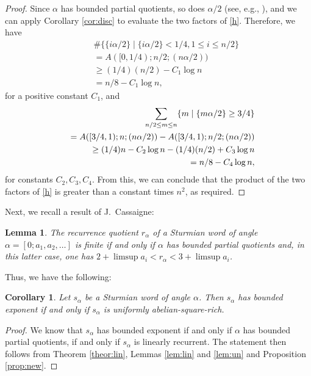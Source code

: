 \documentclass[11pt,reqno]{amsart}
\numberwithin{equation}{section}
\theoremstyle{plain}
\newtheorem{corollary}[theorem]{Corollary}
\newtheorem{lemma}[theorem]{Lemma}
\theoremstyle{definition}
\theoremstyle{remark}
\begin{document}
\begin{proof}
Since $\alpha$ has bounded partial quotients, so does $\alpha/2$ (see, e.g., \cite{LS97}), and we can apply Corollary \ref{cor:disc} to evaluate the two factors of \eqref{h}. Therefore, we have
\begin{eqnarray*}
&& \# \{ \{i \alpha/2\}\mid\{i \alpha/2\}<1/4, 1\leq i\leq n/2\} \\ 
%
&& = A([0,1/4);n/2;(n\alpha/2)) \\\
%
&& \geq (1/4)(n/2)-C_1\log n \\
&& = n/8-C_1\log n,
\end{eqnarray*}
for a positive constant $C_1$, and
\begin{eqnarray*}
&& \hspace{-3mm} \sum_{n/2\leq m\leq n} \{ m \mid \{m \alpha/2\}\geq 3/4 \} \\
%
&& =A([3/4,1);n;(n\alpha/2))-A([3/4,1);n/2;(n\alpha/2)) \\
&&  \geq (1/4)n-C_2\log n - (1/4)(n/2) +C_3\log n \\
%
&& = n/8 - C_4 \log n,
\end{eqnarray*}
for  constants $C_2,C_3,C_4$. From this, we can conclude that the product of the two factors of \eqref{h} is greater than a constant times $n^2$, as required.
\end{proof}

Next, we recall a result of J.~Cassaigne:

\begin{lemma}\cite[Prop.~5]{Ca99}
 The recurrence quotient $r_{\alpha}$ of a Sturmian word of angle $\alpha=[0;a_1,a_2,\ldots]$ is finite if and only if $\alpha$ has bounded partial quotients and, in this latter case, one has $2+\limsup a_i < r_{\alpha} <3+\limsup a_i$.
\end{lemma}

Thus, we have the following:

\begin{corollary}
 Let $s_{\alpha}$ be a Sturmian word of angle $\alpha$. Then  $s_{\alpha}$ has bounded exponent if and only if $s_{\alpha}$ is uniformly abelian-square-rich.
\end{corollary}

\begin{proof}
We know that $s_{\alpha}$  has bounded exponent if and only if $\alpha$ has bounded partial quotients, if and only if $s_{\alpha}$ is linearly recurrent. The statement then follows from Theorem \ref{theor:lin}, Lemmas \ref{lem:lin} and \ref{lem:un} and Proposition \ref{prop:new}.
\end{proof}
\end{document}
